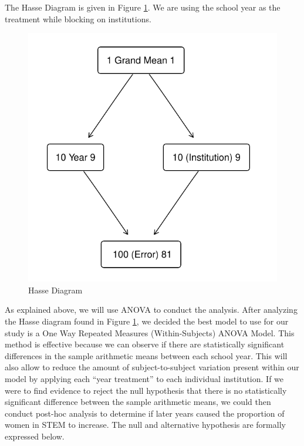 \documentclass[]{article}
\begin{document}
The Hasse Diagram is given in Figure \ref{fig:hasse}. We are using the
school year as the treatment while blocking on institutions.

\begin{figure}

{\centering \includegraphics{Stat_461_Final_Project_Report_files/figure-latex/hasse-1} 

}

\caption{Hasse Diagram}\label{fig:hasse}
\end{figure}

As explained above, we will use ANOVA to conduct the analysis. After
analyzing the Hasse diagram found in Figure \ref{fig:hasse}, we decided
the best model to use for our study is a One Way Repeated Measures
(Within-Subjects) ANOVA Model. This method is effective because we can
observe if there are statistically significant differences in the sample
arithmetic means between each school year. This will also allow to
reduce the amount of subject-to-subject variation present within our
model by applying each ``year treatment'' to each individual
institution. If we were to find evidence to reject the null hypothesis
that there is no statistically significant difference between the sample
arithmetic means, we could then conduct post-hoc analysis to determine
if later years caused the proportion of women in STEM to increase. The
null and alternative hypothesis are formally expressed below.
\end{document}

